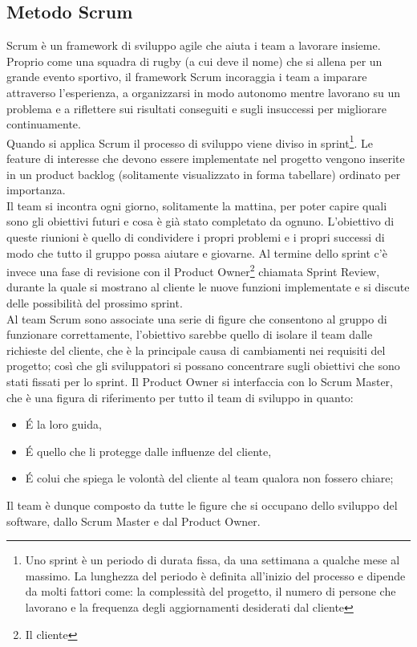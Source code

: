 \subsection{Metodo Scrum}
Scrum è un framework di sviluppo agile che aiuta i team a lavorare insieme. Proprio come una squadra di rugby (a cui deve il nome) che si allena per un grande evento sportivo, il framework Scrum incoraggia i team a imparare attraverso l'esperienza, a organizzarsi in modo autonomo mentre lavorano su un problema e a riflettere sui risultati conseguiti e sugli insuccessi per migliorare continuamente.\cite{ScrumAtlassian}
\\
Quando si applica Scrum il processo di sviluppo viene diviso in sprint\footnote{Uno sprint è un periodo di durata fissa, da una settimana a qualche mese al massimo. La lunghezza del periodo è definita all'inizio del processo e dipende da molti fattori come: la complessità del progetto, il numero di persone che lavorano e la frequenza degli aggiornamenti desiderati dal cliente}. Le feature di interesse che devono essere implementate nel progetto vengono inserite in un product backlog (solitamente visualizzato in forma tabellare) ordinato per importanza.
\\
Il team si incontra ogni giorno, solitamente la mattina, per poter capire quali sono gli obiettivi futuri e cosa è già stato completato da ognuno. L'obiettivo di queste riunioni è quello di condividere i propri problemi e i propri successi di modo che tutto il gruppo possa aiutare e giovarne. Al termine dello sprint c'è invece una fase di revisione con il Product Owner\footnote{Il cliente} chiamata Sprint Review, durante la quale si mostrano al cliente le nuove funzioni implementate e si discute delle possibilità del prossimo sprint.\cite{Larman2016}
\\
Al team Scrum sono associate una serie di figure che consentono al gruppo di funzionare correttamente, l'obiettivo sarebbe quello di isolare il team dalle richieste del cliente, che è la principale causa di cambiamenti nei requisiti del progetto; così che gli sviluppatori si possano concentrare sugli obiettivi che sono stati fissati per lo sprint.
Il Product Owner si interfaccia con lo Scrum Master, che è una figura di riferimento per tutto il team di sviluppo in quanto:
\begin{itemize}
    \item \'E la loro guida,
    \item \'E quello che li protegge dalle influenze del cliente,
    \item \'E colui che spiega le volontà del cliente al team qualora non fossero chiare;
\end{itemize}
Il team è dunque composto da tutte le figure che si occupano dello sviluppo del software, dallo Scrum Master e dal Product Owner.




